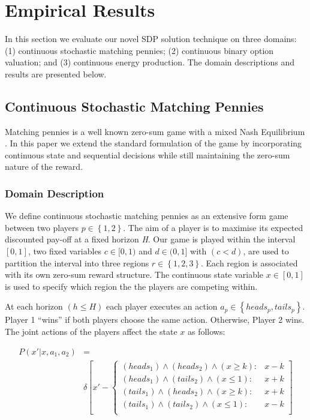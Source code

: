 \section{Empirical Results}
\label{sec:results}

In this section we evaluate our novel SDP solution technique on three
domains: (1) continuous stochastic matching pennies; (2) continuous
binary option valuation; and (3) continuous energy production. 
The domain descriptions and results are presented
below.

\subsection{Continuous Stochastic Matching Pennies}

Matching pennies is a well known zero-sum game with a 
mixed Nash Equilibrium \cite{Osborne_2004}. In this paper we extend 
the standard formulation of the game by incorporating continuous state 
and sequential decisions while still maintaining the zero-sum nature of 
the reward.

\subsubsection{Domain Description}

We define continuous stochastic matching pennies as an extensive
form game between two players $p \in \left\{1, 2 \right\}$. The aim of a 
player is to maximise its expected discounted pay-off at a fixed horizon \emph{H}. 
Our game is played within the interval $[0, 1]$, two fixed variables 
$c \in [0, 1)$ and $d \in (0, 1]$ with $(c < d)$,  are used to partition the interval into
three regions $r \in \left\{1, 2, 3 \right\}$. Each region is associated 
with its own zero-sum reward structure. The continuous state variable 
$x \in [0, 1]$ is used to specify which region the the players are competing within.

At each horizon $(h \leq H)$ each player executes an action $a_p \in \left\{ heads_p, tails_p \right\}$. 
Player 1 ``wins'' if both players choose the same action. Otherwise, Player 2 wins. 
The joint actions of the players affect the state $x$ as follows:

{\scriptsize 
\begin{align*}
P(x' | x, a_{1}, a_{2}) &= \\
&
\delta \left[ x' - \begin{cases}
      (heads_{1}) \wedge (heads_{2}) \wedge (x \geq k) : & x - k \\
      (heads_{1}) \wedge (tails_{2}) \wedge (x \leq 1) : & x + k \\
      (tails_{1}) \wedge (heads_{2}) \wedge (x \geq k): & x + k \\
      (tails_{1}) \wedge (tails_{2}) \wedge (x \leq 1) : & x - k  \\
    \end{cases} \right]
\end{align*}
}%

